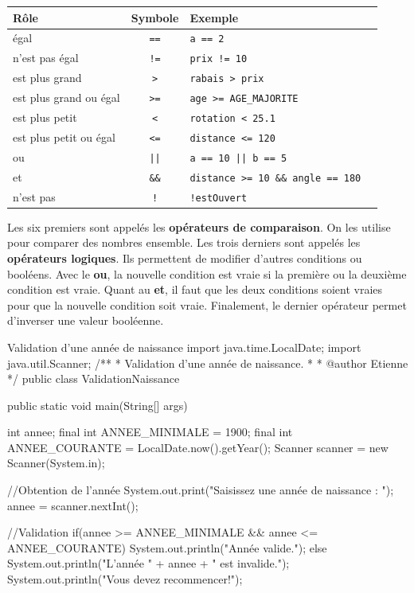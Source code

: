 \documentclass[12pt]{report}
\begin{document}
\begin{center}
\renewcommand{\arraystretch}{1.5}
	\begin{tabularx}{0.8\linewidth}{l c X X} \toprule
		\textbf{Rôle} & \textbf{Symbole} & \textbf{Exemple} \\ \midrule
		égal & \texttt{==} & \texttt{a == 2} \\
		n'est pas égal & \texttt{!=} & \texttt{prix != 10} \\
		est plus grand & \texttt{>} & \texttt{rabais > prix} \\
		est plus grand ou égal & \texttt{>=} & \texttt{age >= AGE\_MAJORITE} \\
		est plus petit & \texttt{<} & \texttt{rotation < 25.1} \\
		est plus petit ou égal & \texttt{<=} & \texttt{distance <= 120} \\
		ou & \texttt{||} & \texttt{a == 10 || b == 5} \\
		et & \texttt{\&\&} & \texttt{distance >= 10 \&\& angle == 180} \\
		n'est pas & \texttt{!} & \texttt{!estOuvert} \\ \bottomrule
	\end{tabularx}
\end{center}

Les six premiers sont appelés les \textbf{opérateurs de comparaison}. On les utilise pour comparer des nombres ensemble. Les trois derniers sont appelés les \textbf{opérateurs logiques}. Ils permettent de modifier d'autres conditions ou booléens. Avec le \textbf{ou}, la nouvelle condition est vraie si la première ou la deuxième condition est vraie. Quant au \textbf{et}, il faut que les deux conditions soient vraies pour que la nouvelle condition soit vraie. Finalement, le dernier opérateur permet d'inverser une valeur booléenne. 


\begin{MyTCB}{Validation d'une année de naissance}
import java.time.LocalDate;
import java.util.Scanner;
/**
 * Validation d'une année de naissance.
 * 
 * @author Etienne
 */
public class ValidationNaissance {

	public static void main(String[] args) {
		
		int annee;
		final int ANNEE_MINIMALE = 1900;
		final int ANNEE_COURANTE = LocalDate.now().getYear();
		Scanner scanner = new Scanner(System.in);
		
		
		//Obtention de l'année
		System.out.print("Saisissez une année de naissance : ");
		annee = scanner.nextInt();
		
		
		//Validation
		if(annee >= ANNEE_MINIMALE && annee <= ANNEE_COURANTE) {
			System.out.println("Année valide.");
		}
		else {
			System.out.println("L'année " + annee + " est invalide.");
			System.out.println("Vous devez recommencer!");
		}

	}

}
\end{MyTCB}
\end{document}
